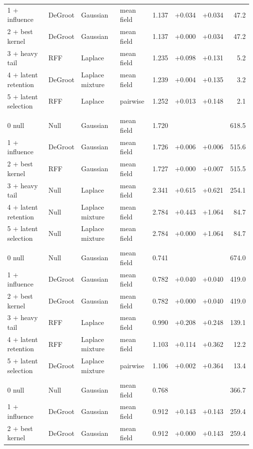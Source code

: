 \begin{longtable}{llllrrrr}
1 + influence & DeGroot & Gaussian & mean field & 1.137 & +0.034 & +0.034 & 47.2 \\
2 + best kernel & DeGroot & Gaussian & mean field & 1.137 & +0.000 & +0.034 & 47.2 \\
3 + heavy tail & RFF & Laplace & mean field & 1.235 & +0.098 & +0.131 & 5.2 \\
4 + latent retention & DeGroot & Laplace mixture & mean field & 1.239 & +0.004 & +0.135 & 3.2 \\
5 + latent selection & RFF & Laplace & pairwise & 1.252 & +0.013 & +0.148 & 2.1 \\
\midrule
\multicolumn{8}{l}{\kozitsin{}} \\
0 null & Null & Gaussian & mean field & 1.720 &  &  & 618.5 \\
1 + influence & DeGroot & Gaussian & mean field & 1.726 & +0.006 & +0.006 & 515.6 \\
2 + best kernel & RFF & Gaussian & mean field & 1.727 & +0.000 & +0.007 & 515.5 \\
3 + heavy tail & Null & Laplace & mean field & 2.341 & +0.615 & +0.621 & 254.1 \\
4 + latent retention & Null & Laplace mixture & mean field & 2.784 & +0.443 & +1.064 & 84.7 \\
5 + latent selection & Null & Laplace mixture & mean field & 2.784 & +0.000 & +1.064 & 84.7 \\
\midrule
\multicolumn{8}{l}{\markets{}} \\
0 null & Null & Gaussian & mean field & 0.741 &  &  & 674.0 \\
1 + influence & DeGroot & Gaussian & mean field & 0.782 & +0.040 & +0.040 & 419.0 \\
2 + best kernel & DeGroot & Gaussian & mean field & 0.782 & +0.000 & +0.040 & 419.0 \\
3 + heavy tail & RFF & Laplace & mean field & 0.990 & +0.208 & +0.248 & 139.1 \\
4 + latent retention & RFF & Laplace mixture & mean field & 1.103 & +0.114 & +0.362 & 12.2 \\
5 + latent selection & DeGroot & Laplace mixture & pairwise & 1.106 & +0.002 & +0.364 & 13.4 \\
\midrule
\multicolumn{8}{l}{\vkc{}} \\
0 null & Null & Gaussian & mean field & 0.768 &  &  & 366.7 \\
1 + influence & DeGroot & Gaussian & mean field & 0.912 & +0.143 & +0.143 & 259.4 \\
2 + best kernel & DeGroot & Gaussian & mean field & 0.912 & +0.000 & +0.143 & 259.4 \\

\end{longtable}
